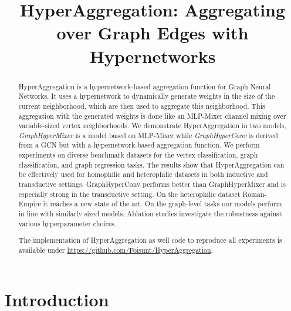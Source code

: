\documentclass[conference]{IEEEtran}
\begin{document}
\title{HyperAggregation: Aggregating over Graph Edges with Hypernetworks} 

\author{
\and
{}
}


\maketitle

\begin{abstract}
HyperAggregation is a hypernetwork-based aggregation function for Graph Neural Networks.
It uses a hypernetwork to dynamically generate weights in the size of the current neighborhood, which are then used to aggregate this neighborhood. 
This aggregation with the generated weights is done like an MLP-Mixer channel mixing over variable-sized vertex neighborhoods.
We demonstrate HyperAggregation in two models, \textit{GraphHyperMixer} is a model based on MLP-Mixer while \textit{GraphHyperConv} is derived from a GCN but with a hypernetwork-based aggregation function. 
We perform experiments on diverse benchmark datasets for the vertex classification, graph classification, and graph regression tasks.
The results show that HyperAggregation can be effectively used for homophilic and heterophilic datasets in both inductive and transductive settings.
GraphHyperConv performs better than GraphHyperMixer and is especially strong in the transductive setting.
On the heterophilic dataset Roman-Empire it reaches a new state of the art.
On the graph-level tasks our models perform in line with similarly sized models.
Ablation studies investigate the robustness against various hyperparameter choices.

The implementation of HyperAggregation as well code to reproduce all experiments is available under \url{https://github.com/Foisunt/HyperAggregation}.

\end{abstract}

\IEEEpeerreviewmaketitle


\section{Introduction}
\end{document}
